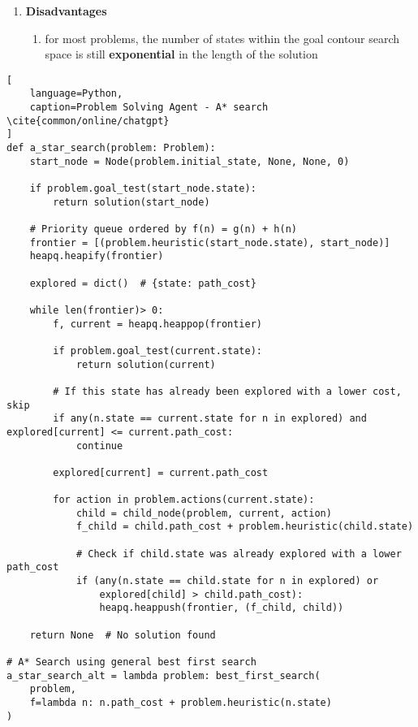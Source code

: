 \begin{enumerate}[itemsep=0.2cm]
    \item \textbf{Disadvantages}
    \begin{enumerate}
        \item for most problems, the number of states within the goal contour search space is still \textbf{exponential} in the length of the solution
        \hfill \cite{ai/book/Artificial-Intelligence-A-Modern-Approach/Russell-Norvig}
    \end{enumerate}
\end{enumerate}


\vspace{0.5cm}

\begin{lstlisting}[
    language=Python,
    caption=Problem Solving Agent - A* search \cite{common/online/chatgpt}
]
def a_star_search(problem: Problem):
    start_node = Node(problem.initial_state, None, None, 0)

    if problem.goal_test(start_node.state):
        return solution(start_node)

    # Priority queue ordered by f(n) = g(n) + h(n)
    frontier = [(problem.heuristic(start_node.state), start_node)]
    heapq.heapify(frontier)

    explored = dict()  # {state: path_cost}

    while len(frontier)> 0:
        f, current = heapq.heappop(frontier)

        if problem.goal_test(current.state):
            return solution(current)

        # If this state has already been explored with a lower cost, skip
        if any(n.state == current.state for n in explored) and explored[current] <= current.path_cost:
            continue

        explored[current] = current.path_cost

        for action in problem.actions(current.state):
            child = child_node(problem, current, action)
            f_child = child.path_cost + problem.heuristic(child.state)

            # Check if child.state was already explored with a lower path_cost
            if (any(n.state == child.state for n in explored) or 
                explored[child] > child.path_cost):
                heapq.heappush(frontier, (f_child, child))

    return None  # No solution found

# A* Search using general best first search
a_star_search_alt = lambda problem: best_first_search(
    problem, 
    f=lambda n: n.path_cost + problem.heuristic(n.state)
)
\end{lstlisting}












